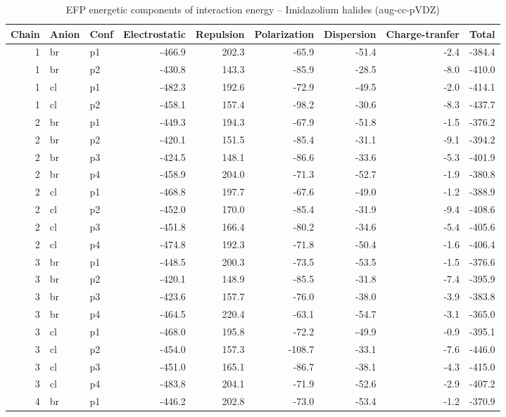 \documentclass[a4paper]{article}
\begin{document}
\begin{table}[ht]
\centering
\footnotesize
\caption{EFP energetic components of interaction energy -- Imidazolium halides (aug-cc-pVDZ)}
\begin{tabular}{rllrrrrrr}
  \hline
Chain & Anion & Conf & Electrostatic & Repulsion & Polarization & Dispersion & Charge-tranfer & Total \\ 
  \hline
 1 & br & p1 & -466.9 & 202.3 & -65.9 & -51.4 & -2.4 & -384.4 \\ 
   1 & br & p2 & -430.8 & 143.3 & -85.9 & -28.5 & -8.0 & -410.0 \\ 
   1 & cl & p1 & -482.3 & 192.6 & -72.9 & -49.5 & -2.0 & -414.1 \\ 
   1 & cl & p2 & -458.1 & 157.4 & -98.2 & -30.6 & -8.3 & -437.7 \\ 
   2 & br & p1 & -449.3 & 194.3 & -67.9 & -51.8 & -1.5 & -376.2 \\ 
   2 & br & p2 & -420.1 & 151.5 & -85.4 & -31.1 & -9.1 & -394.2 \\ 
   2 & br & p3 & -424.5 & 148.1 & -86.6 & -33.6 & -5.3 & -401.9 \\ 
   2 & br & p4 & -458.9 & 204.0 & -71.3 & -52.7 & -1.9 & -380.8 \\ 
   2 & cl & p1 & -468.8 & 197.7 & -67.6 & -49.0 & -1.2 & -388.9 \\ 
   2 & cl & p2 & -452.0 & 170.0 & -85.4 & -31.9 & -9.4 & -408.6 \\ 
   2 & cl & p3 & -451.8 & 166.4 & -80.2 & -34.6 & -5.4 & -405.6 \\ 
   2 & cl & p4 & -474.8 & 192.3 & -71.8 & -50.4 & -1.6 & -406.4 \\ 
   3 & br & p1 & -448.5 & 200.3 & -73.5 & -53.5 & -1.5 & -376.6 \\ 
   3 & br & p2 & -420.1 & 148.9 & -85.5 & -31.8 & -7.4 & -395.9 \\ 
   3 & br & p3 & -423.6 & 157.7 & -76.0 & -38.0 & -3.9 & -383.8 \\ 
   3 & br & p4 & -464.5 & 220.4 & -63.1 & -54.7 & -3.1 & -365.0 \\ 
   3 & cl & p1 & -468.0 & 195.8 & -72.2 & -49.9 & -0.9 & -395.1 \\ 
   3 & cl & p2 & -454.0 & 157.3 & -108.7 & -33.1 & -7.6 & -446.0 \\ 
   3 & cl & p3 & -451.0 & 165.1 & -86.7 & -38.1 & -4.3 & -415.0 \\ 
   3 & cl & p4 & -483.8 & 204.1 & -71.9 & -52.6 & -2.9 & -407.2 \\ 
   4 & br & p1 & -446.2 & 202.8 & -73.0 & -53.4 & -1.2 & -370.9 \\ 

\end{tabular}
\end{table}
\end{document}
